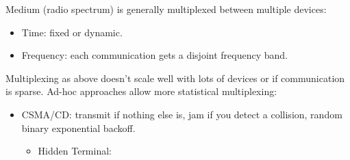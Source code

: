 \documentclass[a4paper, 11pt]{article}
\begin{document}
{    Medium (radio spectrum) is generally multiplexed between multiple devices:
    \begin{itemize}
    \item Time: fixed or dynamic.
    \item Frequency: each communication gets a disjoint frequency band.
    \end{itemize}

    Multiplexing as above doesn't scale well with lots of devices or if communication is sparse. Ad-hoc approaches allow more statistical multiplexing:
    \begin{itemize}
    \item
    {
        CSMA/CD: transmit if nothing else is, jam if you detect a collision, random binary exponential backoff.
        \begin{itemize}
        \item Hidden Terminal:
        \end{itemize}
    }
    \end{itemize}
}
\end{document}
